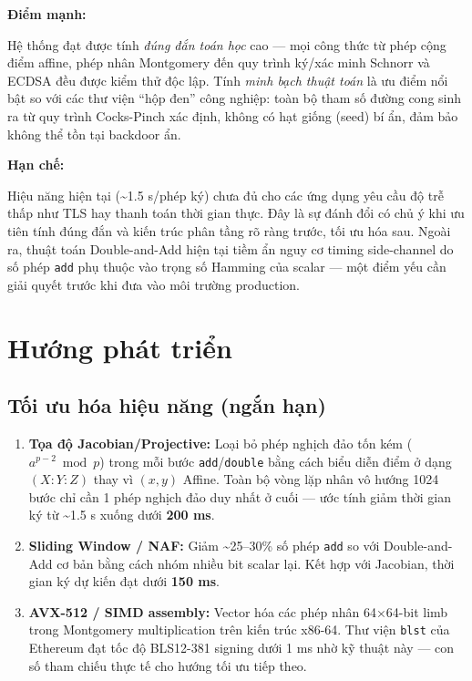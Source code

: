 \textbf{Điểm mạnh:}

Hệ thống đạt được tính \emph{đúng đắn toán học} cao --- mọi công thức từ
phép cộng điểm affine, phép nhân Montgomery đến quy trình ký/xác minh
Schnorr và ECDSA đều được kiểm thử độc lập. Tính \emph{minh bạch thuật
toán} là ưu điểm nổi bật so với các thư viện ``hộp đen'' công nghiệp:
toàn bộ tham số đường cong sinh ra từ quy trình Cocks-Pinch xác định,
không có hạt giống (seed) bí ẩn, đảm bảo không thể tồn tại backdoor ẩn.

\textbf{Hạn chế:}

Hiệu năng hiện tại (\textasciitilde1.5 s/phép ký) chưa đủ cho các ứng
dụng yêu cầu độ trễ thấp như TLS hay thanh toán thời gian thực. Đây là
sự đánh đổi có chủ ý khi ưu tiên tính đúng đắn và kiến trúc phân tầng rõ
ràng trước, tối ưu hóa sau. Ngoài ra, thuật toán Double-and-Add hiện tại
tiềm ẩn nguy cơ timing side-channel do số phép \texttt{add} phụ thuộc
vào trọng số Hamming của scalar --- một điểm yếu cần giải quyết trước
khi đưa vào môi trường production.

\section{Hướng phát triển}\label{hux1b0ux1edbng-phuxe1t-triux1ec3n}

\subsection{Tối ưu hóa hiệu năng (ngắn
hạn)}\label{tux1ed1i-ux1b0u-huxf3a-hiux1ec7u-nux103ng-ngux1eafn-hux1ea1n}

\begin{enumerate}
\def\labelenumi{\arabic{enumi}.}
\item
  \textbf{Tọa độ Jacobian/Projective:} Loại bỏ phép nghịch đảo tốn kém
  (\(a^{p-2} \bmod p\)) trong mỗi bước \texttt{add}/\texttt{double} bằng
  cách biểu diễn điểm ở dạng \((X:Y:Z)\) thay vì \((x, y)\) Affine. Toàn
  bộ vòng lặp nhân vô hướng 1024 bước chỉ cần 1 phép nghịch đảo duy nhất
  ở cuối --- ước tính giảm thời gian ký từ \textasciitilde1.5 s xuống
  dưới \textbf{200 ms}.
\item
  \textbf{Sliding Window / NAF:} Giảm \textasciitilde25--30\% số phép
  \texttt{add} so với Double-and-Add cơ bản bằng cách nhóm nhiều bit
  scalar lại. Kết hợp với Jacobian, thời gian ký dự kiến đạt dưới
  \textbf{150 ms}.
\item
  \textbf{AVX-512 / SIMD assembly:} Vector hóa các phép nhân 64×64-bit
  limb trong Montgomery multiplication trên kiến trúc x86-64. Thư viện
  \texttt{blst} của Ethereum đạt tốc độ BLS12-381 signing dưới 1 ms nhờ
  kỹ thuật này --- con số tham chiếu thực tế cho hướng tối ưu tiếp theo.
\end{enumerate}

